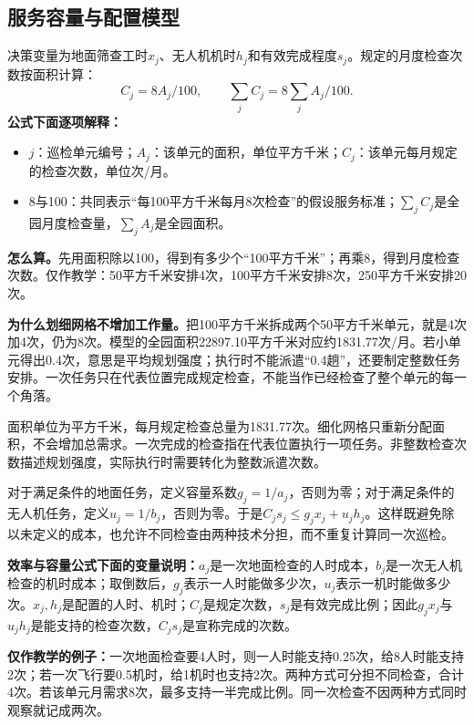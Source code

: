 \documentclass[12pt,a4paper]{article}
\numberwithin{equation}{section}
\begin{document}
\subsection{服务容量与配置模型}
决策变量为地面筛查工时$x_j$、无人机机时$h_j$和有效完成程度$s_j$。规定的月度检查次数按面积计算：
\begin{equation}
C_j=8A_j/100,\qquad\sum_jC_j=8\sum_jA_j/100.
\label{eq:checks}
\end{equation}
\noindent\textbf{公式下面逐项解释：}
\begin{itemize}
\item $j$：巡检单元编号；$A_j$：该单元的面积，单位平方千米；$C_j$：该单元每月规定的检查次数，单位次/月。
\item 8与100：共同表示“每100平方千米每月8次检查”的假设服务标准；$\sum_j C_j$是全园月度检查量，$\sum_j A_j$是全园面积。
\end{itemize}
\noindent\textbf{怎么算。}先用面积除以100，得到有多少个“100平方千米”；再乘8，得到月度检查次数。仅作教学：50平方千米安排4次，100平方千米安排8次，250平方千米安排20次。

\noindent\textbf{为什么划细网格不增加工作量。}把100平方千米拆成两个50平方千米单元，就是4次加4次，仍为8次。模型的全园面积22897.10平方千米对应约1831.77次/月。若小单元得出0.4次，意思是平均规划强度；执行时不能派遣“0.4趟”，还要制定整数任务安排。一次任务只在代表位置完成规定检查，不能当作已经检查了整个单元的每一个角落。

面积单位为平方千米，每月规定检查总量为1831.77次。细化网格只重新分配面积，不会增加总需求。一次完成的检查指在代表位置执行一项任务。非整数检查次数描述规划强度，实际执行时需要转化为整数派遣次数。

对于满足条件的地面任务，定义容量系数$g_j=1/a_j$，否则为零；对于满足条件的无人机任务，定义$u_j=1/b_j$，否则为零。于是$C_js_j\le g_jx_j+u_jh_j$。这样既避免除以未定义的成本，也允许不同检查由两种技术分担，而不重复计算同一次巡检。

\noindent\textbf{效率与容量公式下面的变量说明：}$a_j$是一次地面检查的人时成本，$b_j$是一次无人机检查的机时成本；取倒数后，$g_j$表示一人时能做多少次，$u_j$表示一机时能做多少次。$x_j,h_j$是配置的人时、机时；$C_j$是规定次数，$s_j$是有效完成比例；因此$g_jx_j$与$u_jh_j$是能支持的检查次数，$C_js_j$是宣称完成的次数。

\noindent\textbf{仅作教学的例子：}一次地面检查要4人时，则一人时能支持0.25次，给8人时能支持2次；若一次飞行要0.5机时，给1机时也支持2次。两种方式可分担不同检查，合计4次。若该单元月需求8次，最多支持一半完成比例。同一次检查不因两种方式同时观察就记成两次。
\end{document}
